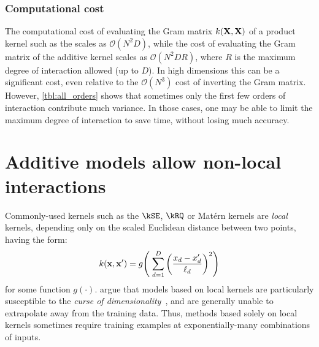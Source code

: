 

\subsubsection{Computational cost}
The computational cost of evaluating the Gram matrix $k(\mathbf{X}, \mathbf{X})$ of a product kernel such as the \seard{} scales as $\mathcal{O}(N^2D)$, while the cost of evaluating the Gram matrix of the additive kernel scales as $\mathcal{O}(N^2DR)$, where $R$ is the maximum degree of interaction allowed (up to $D$).
In high dimensions this can be a significant cost, even relative to the $\mathcal{O}(N^3)$ cost of inverting the Gram matrix.
However, \cref{tbl:all_orders} shows that sometimes only the first few orders of interaction contribute much variance.
In those cases, one may be able to limit the maximum degree of interaction to save time, without losing much accuracy.



\section{Additive models allow non-local interactions}

Commonly-used kernels such as the $\kSE$, $\kRQ$ or Mat\'{e}rn kernels are \emph{local} kernels, depending only on the scaled Euclidean distance between two points, having the form:
\begin{align}
k({\bf x, x'}) = g \!\left( \; \sum_{d=1}^D \left( \frac{  x_{d} - x_{d}' }{ \ell_d } \right)^2 \right)
\end{align}
for some function $g(\cdot)$.
\citet{bengio2006curse} argue that models based on local kernels are particularly susceptible to the \emph{curse of dimensionality}~\citep{bellman1956dynamic}, and are generally unable to extrapolate away from the training data.
Thus, methods based solely on local kernels sometimes require training examples at exponentially-many combinations of inputs.

